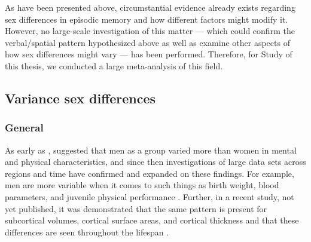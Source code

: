 As have been presented above, circumstantial evidence already exists regarding sex differences in episodic memory and how different factors might modify it. However, no large-scale investigation of this matter --- which could confirm the verbal/spatial pattern hypothesized above as well as examine other aspects of how sex differences might vary --- has been performed. Therefore, for Study  of this thesis, we conducted a large meta-analysis of this field.

\subsection{Variance sex differences} \label{Variance_differences} \subsubsection{General}

As early as \citeyear{Ellis1894}, \citeauthor{Ellis1894} suggested that men as a group varied more than women in mental and physical characteristics, and since then investigations of large data sets across regions and time have confirmed and expanded on these findings. For example, men are more variable when it comes to such things as birth weight, blood parameters, and juvenile physical performance \parencite{Lehre2009}. Further, in a recent study, not yet published, it was demonstrated that the same pattern is present for subcortical volumes, cortical surface areas, and cortical thickness and that these differences are seen throughout the lifespan \parencite{Wierenga2020}.

